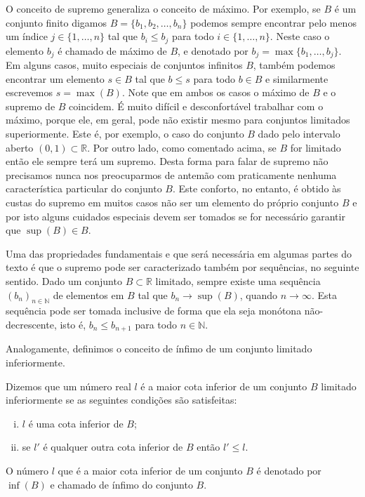 \begin{subappendices}
O conceito de supremo generaliza o conceito de máximo. Por exemplo,
se $B$ é um conjunto finito digamos $B=\{b_1,b_2,\ldots,b_n\}$ podemos sempre
encontrar pelo menos um índice $j\in \{1,\ldots,n\}$ tal que $b_i\leqslant b_j$
para todo $i\in\{1,\ldots,n\}$. Neste caso o elemento $b_j$ é chamado de máximo de $B$,
e denotado por $b_j=\max\{b_1,\ldots,b_j\}$.  Em alguns casos, muito especiais de conjuntos
infinitos $B$, também podemos encontrar um elemento $s\in B$ tal que $b\leqslant s$
para todo $b\in B$ e similarmente escrevemos $s=\max(B)$. Note que em ambos os casos
o máximo de $B$ e o supremo de $B$ coincidem. É muito difícil e desconfortável trabalhar
com o máximo, porque ele, em geral, pode não existir mesmo para conjuntos limitados superiormente. Este é, por exemplo, o caso do conjunto $B$ dado pelo intervalo aberto $(0,1)\subset \mathbb{R}$. 
Por outro lado, como comentado acima, se $B$ for limitado então ele sempre terá um supremo.
Desta forma para falar de supremo não precisamos nunca nos preocuparmos de antemão 
com praticamente nenhuma característica particular do conjunto $B$. Este conforto,
no entanto, é obtido às custas do supremo em muitos casos não ser um elemento do próprio conjunto $B$
e por isto alguns cuidados especiais devem ser tomados se for necessário garantir que $\sup(B)\in B$.

Uma das propriedades fundamentais e que será necessária em algumas partes do texto é que o 
supremo pode ser caracterizado também por sequências, no seguinte sentido. 
Dado um conjunto $B\subset\mathbb{R}$ limitado, sempre existe uma sequência $(b_n)_{n\in\mathbb{N}}$
de elementos em $B$ tal que $b_n\to \sup(B)$, quando $n\to\infty$. Esta sequência pode ser tomada
inclusive de forma que ela seja monótona não-decrescente, isto é, $b_n\leq b_{n+1}$ para todo $n\in\mathbb{N}$. 

Analogamente, definimos o conceito de ínfimo de um conjunto limitado inferiormente.

\begin{definicao}[Ínfimo]\label{def-inf}
Dizemos que um número real $l$ é a maior cota inferior de um conjunto $B$ limitado
inferiormente se as seguintes condições são satisfeitas:
\begin{enumerate}[i)]
\item $l$ é uma cota inferior de $B$; 
\item  se $l'$ é qualquer outra cota inferior de $B$ então $l'\leq l$. 
\end{enumerate}
O número $l$ que é a maior cota inferior de um conjunto $B$ é denotado 
por $\inf(B)$ e chamado de ínfimo do conjunto $B$.
\end{definicao}



\end{subappendices}
